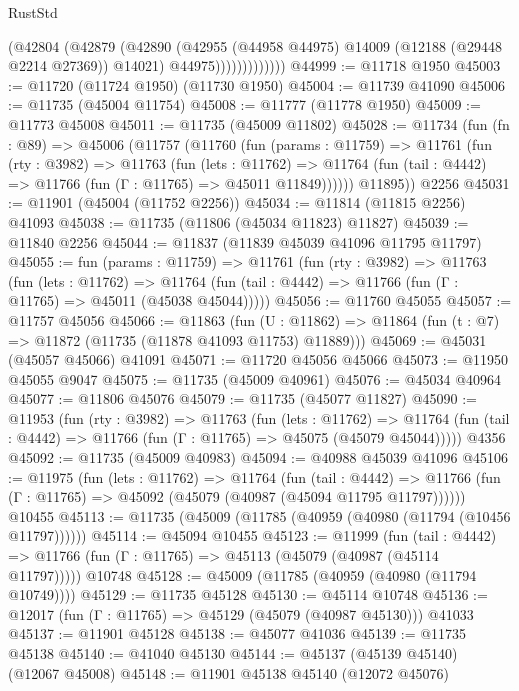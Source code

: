\begin{lexlean}{RustStd}
\begin{coremodule}
                        (@42804
                          (@42879
                            (@42890
                              (@42955 (@44958 @44975) @14009 (@12188 (@29448 @2214 @27369)) @14021)
                              @44975)))))))))))))
@44999 := @11718 @1950
@45003 := @11720 (@11724 @1950) (@11730 @1950)
@45004 := @11739 @41090
@45006 := @11735 (@45004 @11754)
@45008 := @11777 (@11778 @1950)
@45009 := @11773 @45008
@45011 := @11735 (@45009 @11802)
@45028 := @11734
    (fun (fn : @89) =>
    @45006
      (@11757
        (@11760
          (fun (params : @11759) =>
          @11761
            (fun (rty : @3982) =>
            @11763
              (fun (lets : @11762) =>
              @11764 (fun (tail : @4442) => @11766 (fun (Γ : @11765) => @45011 @11849))))))
        @11895))
    @2256
@45031 := @11901 (@45004 (@11752 @2256))
@45034 := @11814 (@11815 @2256) @41093
@45038 := @11735 (@11806 (@45034 @11823) @11827)
@45039 := @11840 @2256
@45044 := @11837 (@11839 @45039 @41096 @11795 @11797)
@45055 := fun (params : @11759) =>
  @11761
    (fun (rty : @3982) =>
    @11763
      (fun (lets : @11762) =>
      @11764 (fun (tail : @4442) => @11766 (fun (Γ : @11765) => @45011 (@45038 @45044)))))
@45056 := @11760 @45055
@45057 := @11757 @45056
@45066 := @11863
    (fun (U : @11862) => @11864 (fun (t : @7) => @11872 (@11735 (@11878 @41093 @11753) @11889)))
@45069 := @45031 (@45057 @45066) @41091
@45071 := @11720 @45056 @45066
@45073 := @11950 @45055 @9047
@45075 := @11735 (@45009 @40961)
@45076 := @45034 @40964
@45077 := @11806 @45076
@45079 := @11735 (@45077 @11827)
@45090 := @11953
    (fun (rty : @3982) =>
    @11763
      (fun (lets : @11762) =>
      @11764 (fun (tail : @4442) => @11766 (fun (Γ : @11765) => @45075 (@45079 @45044)))))
    @4356
@45092 := @11735 (@45009 @40983)
@45094 := @40988 @45039 @41096
@45106 := @11975
    (fun (lets : @11762) =>
    @11764
      (fun (tail : @4442) =>
      @11766 (fun (Γ : @11765) => @45092 (@45079 (@40987 (@45094 @11795 @11797))))))
    @10455
@45113 := @11735 (@45009 (@11785 (@40959 (@40980 (@11794 (@10456 @11797))))))
@45114 := @45094 @10455
@45123 := @11999
    (fun (tail : @4442) => @11766 (fun (Γ : @11765) => @45113 (@45079 (@40987 (@45114 @11797)))))
    @10748
@45128 := @45009 (@11785 (@40959 (@40980 (@11794 @10749))))
@45129 := @11735 @45128
@45130 := @45114 @10748
@45136 := @12017 (fun (Γ : @11765) => @45129 (@45079 (@40987 @45130))) @41033
@45137 := @11901 @45128
@45138 := @45077 @41036
@45139 := @11735 @45138
@45140 := @41040 @45130
@45144 := @45137 (@45139 @45140) (@12067 @45008)
@45148 := @11901 @45138 @45140 (@12072 @45076)

\end{coremodule}
\end{lexlean}
